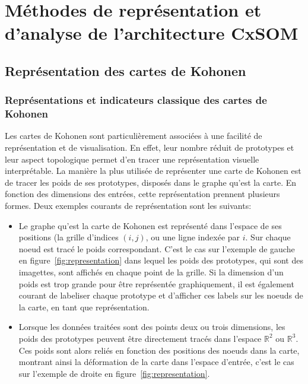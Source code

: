 \chapter{Méthodes de représentation et d'analyse de l'architecture CxSOM}
\graphicspath{{03-Representation/}}

\minitoc
\section{Représentation des cartes de Kohonen}

\subsection{Représentations et indicateurs classique des cartes de Kohonen}

Les cartes de Kohonen sont particulièrement associées à une facilité de représentation et de visualisation. En effet, leur nombre réduit de prototypes et leur aspect topologique permet d'en tracer une représentation visuelle interprétable.
La manière la plus utilisée de représenter une carte de Kohonen est de tracer les poids de ses prototypes, disposés dans le graphe qu'est la carte. En fonction des dimensions des entrées, cette représentation prennent plusieurs formes. Deux exemples courants de représentation sont les suivants: 
\begin{itemize}
\item Le graphe qu'est la carte de Kohonen est représenté dans l'espace de ses positions (la grille d'indices $(i,j)$, ou une ligne indexée par $i$. Sur chaque noeud est tracé le poids correspondant. C'est le cas sur l'exemple de gauche en figure~\ref{fig:representation} dans lequel les poids des prototypes, qui sont des imagettes, sont affichés en chaque point de la grille. Si la dimension d'un poids est trop grande pour être représentée graphiquement, il est également courant de labeliser chaque prototype et d'afficher ces labels sur les noeuds de la carte, en tant que représentation.
\item Lorsque les données traitées sont des points deux ou trois dimensions, les poids des prototypes peuvent être directement tracés dans l'espace $\mathbb{R}^2$ ou $\mathbb{R}^3$. Ces poids sont alors reliés en fonction des positions des noeuds dans la carte, montrant ainsi la déformation de la carte dans l'espace d'entrée, c'est le cas sur l'exemple de droite en figure~\ref{fig:representation}.
\end{itemize}

